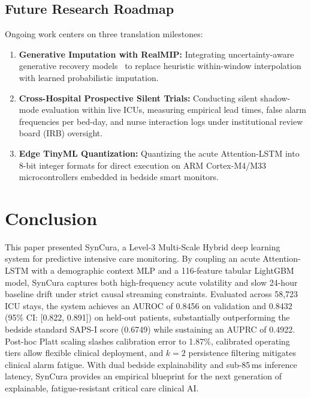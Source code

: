 \documentclass[conference]{IEEEtran}
\begin{document}
\subsection{Future Research Roadmap}
Ongoing work centers on three translation milestones:
\begin{enumerate}
    \item \textbf{Generative Imputation with RealMIP:} Integrating uncertainty-aware generative recovery models~\cite{xie2025} to replace heuristic within-window interpolation with learned probabilistic imputation.
    \item \textbf{Cross-Hospital Prospective Silent Trials:} Conducting silent shadow-mode evaluation within live ICUs, measuring empirical lead times, false alarm frequencies per bed-day, and nurse interaction logs under institutional review board (IRB) oversight.
    \item \textbf{Edge TinyML Quantization:} Quantizing the acute Attention-LSTM into 8-bit integer formats for direct execution on ARM Cortex-M4/M33 microcontrollers embedded in bedside smart monitors.
\end{enumerate}

\section{Conclusion}
This paper presented SynCura, a Level-3 Multi-Scale Hybrid deep learning system for predictive intensive care monitoring. By coupling an acute Attention-LSTM with a demographic context MLP and a 116-feature tabular LightGBM model, SynCura captures both high-frequency acute volatility and slow 24-hour baseline drift under strict causal streaming constraints. Evaluated across 58,723 ICU stays, the system achieves an AUROC of 0.8456 on validation and 0.8432 (95\% CI: [0.822, 0.891]) on held-out patients, substantially outperforming the bedside standard SAPS-I score (0.6749) while sustaining an AUPRC of 0.4922. Post-hoc Platt scaling slashes calibration error to 1.87\%, calibrated operating tiers allow flexible clinical deployment, and $k=2$ persistence filtering mitigates clinical alarm fatigue. With dual bedside explainability and sub-85\,ms inference latency, SynCura provides an empirical blueprint for the next generation of explainable, fatigue-resistant critical care clinical AI.



\end{document}
